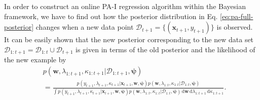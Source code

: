
In order to construct an online PA-I regression algorithm within the Bayesian framework, we have to find out how the posterior distribution in Eq. \eqref{eq:pa-full-posterior} changes when a new data point $\mathcal{D}_{t+1} = \{(\mathbf{x}_{t+1}, y_{t+1})\}$ is observed. It can be easily shown that the new posterior corresponding to the new data set $\mathcal{D}_{1:t+1} = \mathcal{D}_{1:t} \cup \mathcal{D}_{t+1}$ is given in terms of the old posterior and the likelihood of the new example by
\begin{equation}
\begin{split}
\label{eq:pa-full-posterior-streaming}
	& p(\mathbf{w}, \lambda_{1:t+1}, \kappa_{1:t+1}|\mathcal{D}_{1:t+1}, \boldsymbol{\psi})
	\\	
	&= \frac{p(y_{t+1}, \lambda_{t+1}, \kappa_{t+1}|\mathbf{x}_{t+1}, \mathbf{w}, \boldsymbol{\psi})p(\mathbf{w}, \lambda_{1:t}, \kappa_{1:t}|\mathcal{D}_{1:t}, \boldsymbol{\psi})}
	{\int p(y_{t+1}, \lambda_{t+1}, \kappa_{t+1}|\mathbf{x}_{t+1}, \mathbf{w}, \boldsymbol{\psi})p(\mathbf{w}, \lambda_{1:t}, \kappa_{1:t}|\mathcal{D}_{1:t}, \boldsymbol{\psi})
	\,\mathrm{d}\mathbf{w}\,\mathrm{d}\lambda_{1:t+1}\,\mathrm{d}\kappa_{1:t+1}}.
\end{split}
\end{equation}

